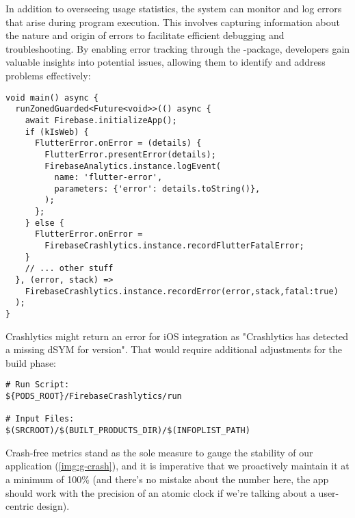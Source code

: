 In addition to overseeing usage statistics, the system can monitor and log errors that arise during program execution. 
This involves capturing information about the nature and origin of errors to facilitate efficient debugging and 
troubleshooting. By enabling error tracking through the -package, developers gain valuable 
insights into potential issues, allowing them to identify and address problems effectively:

\begin{lstlisting}
void main() async {
  runZonedGuarded<Future<void>>(() async {
    await Firebase.initializeApp();
    if (kIsWeb) {
      FlutterError.onError = (details) {
        FlutterError.presentError(details);
        FirebaseAnalytics.instance.logEvent(
          name: 'flutter-error', 
          parameters: {'error': details.toString()},
        );
      };
    } else {
      FlutterError.onError =
        FirebaseCrashlytics.instance.recordFlutterFatalError;
    }
    // ... other stuff
  }, (error, stack) =>
    FirebaseCrashlytics.instance.recordError(error,stack,fatal:true)
  );
}
\end{lstlisting}

\noindent Crashlytics might return an error for iOS integration as "Crashlytics has detected a missing dSYM for version".
That would require additional adjustments for the  build phase:

\begin{lstlisting}[language=terminal]
# Run Script: 
${PODS_ROOT}/FirebaseCrashlytics/run

# Input Files: 
$(SRCROOT)/$(BUILT_PRODUCTS_DIR)/$(INFOPLIST_PATH)
\end{lstlisting}

\noindent Crash-free metrics stand as the sole measure to gauge the stability of our application (\cref{img:g-crash}), 
and it is imperative that we proactively maintain it at a minimum of 100\% (and there's no mistake about the number 
here, the app should work with the precision of an atomic clock if we're talking about a user-centric design).

